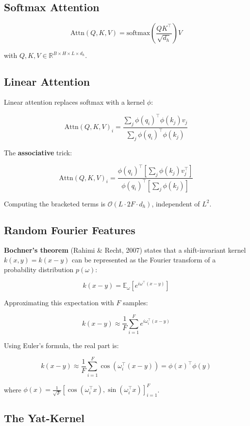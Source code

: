\subsection{Softmax Attention}

\[
\text{Attn}(Q, K, V) = \text{softmax}\!\left(\frac{Q K^\top}{\sqrt{d_h}}\right) V
\]

with $Q, K, V \in \mathbb{R}^{B \times H \times L \times d_h}$.

\subsection{Linear Attention}

Linear attention replaces softmax with a kernel $\phi$:

\[
\text{Attn}(Q, K, V)_i = \frac{\sum_j \phi(q_i)^\top \phi(k_j) v_j}{\sum_j \phi(q_i)^\top \phi(k_j)}
\]

The \textbf{associative} trick:

\[
\text{Attn}(Q, K, V)_i = \frac{\phi(q_i)^\top \left[ \sum_j \phi(k_j) v_j^\top \right]}{\phi(q_i)^\top \left[ \sum_j \phi(k_j) \right]}
\]

Computing the bracketed terms is $\mathcal{O}(L \cdot 2F \cdot d_h)$, independent of $L^2$.

\subsection{Random Fourier Features}

\textbf{Bochner's theorem} (Rahimi \& Recht, 2007) states that a shift-invariant 
kernel $k(x, y) = k(x - y)$ can be represented as the Fourier transform of 
a probability distribution $p(\omega)$:

\[
k(x - y) = \mathbb{E}_\omega [e^{i \omega^\top (x - y)}]
\]

Approximating this expectation with $F$ samples:

\[
k(x - y) \approx \frac{1}{F} \sum_{i=1}^{F} e^{i \omega_i^\top (x - y)}
\]

Using Euler's formula, the real part is:

\[
k(x - y) \approx \frac{1}{F} \sum_{i=1}^{F} \cos(\omega_i^\top (x - y))
= \phi(x)^\top \phi(y)
\]

where $\phi(x) = \frac{1}{\sqrt{F}} [\cos(\omega_i^\top x), \sin(\omega_i^\top x)]_{i=1}^F$.

\subsection{The Yat-Kernel}

